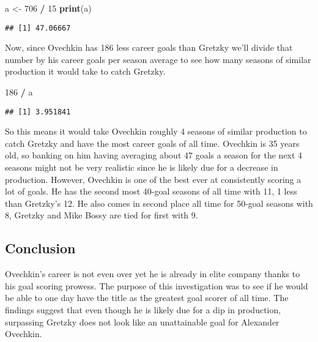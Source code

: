 \documentclass[
]{article}
\newenvironment{Shaded}{\begin{snugshade}}{\end{snugshade}}
\newcommand{\DecValTok}[1]{\textcolor[rgb]{0.00,0.00,0.81}{#1}}
\newcommand{\KeywordTok}[1]{\textcolor[rgb]{0.13,0.29,0.53}{\textbf{#1}}}
\newcommand{\NormalTok}[1]{#1}
\newcommand{\OperatorTok}[1]{\textcolor[rgb]{0.81,0.36,0.00}{\textbf{#1}}}
\newcommand{\StringTok}[1]{\textcolor[rgb]{0.31,0.60,0.02}{#1}}
\begin{document}
\begin{Shaded}
\begin{Highlighting}[]
\NormalTok{a <-}\StringTok{ }\DecValTok{706} \OperatorTok{/}\StringTok{ }\DecValTok{15}
\KeywordTok{print}\NormalTok{(a)}
\end{Highlighting}
\end{Shaded}

\begin{verbatim}
## [1] 47.06667
\end{verbatim}

Now, since Ovechkin has 186 less career goals than Gretzky we'll divide
that number by his career goals per season average to see how many
seasons of similar production it would take to catch Gretzky.

\begin{Shaded}
\begin{Highlighting}[]
\DecValTok{186} \OperatorTok{/}\StringTok{ }\NormalTok{a}
\end{Highlighting}
\end{Shaded}

\begin{verbatim}
## [1] 3.951841
\end{verbatim}

So this means it would take Ovechkin roughly 4 seasons of similar
production to catch Gretzky and have the most career goals of all time.
Ovechkin is 35 years old, so banking on him having averaging about 47
goals a season for the next 4 seasons might not be very realistic since
he is likely due for a decrease in production. However, Ovechkin is one
of the best ever at consistently scoring a lot of goals. He has the
second most 40-goal seasons of all time with 11, 1 less than Gretzky's
12. He also comes in second place all time for 50-goal seasons with 8,
Gretzky and Mike Bossy are tied for first with 9.

\hypertarget{conclusion}{%
\subsection{Conclusion}\label{conclusion}}

Ovechkin's career is not even over yet he is already in elite company
thanks to his goal scoring prowess. The purpose of this investigation
was to see if he would be able to one day have the title as the greatest
goal scorer of all time. The findings suggest that even though he is
likely due for a dip in production, surpassing Gretzky does not look
like an unattainable goal for Alexander Ovechkin.
\end{document}
